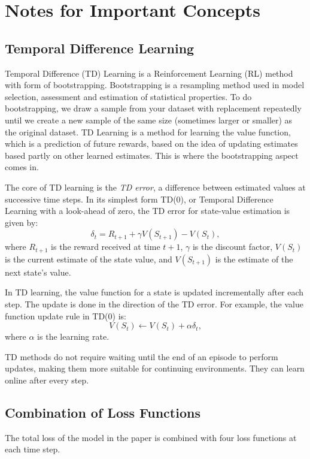 \documentclass[12pt,letterpaper,oneside]{article}
\begin{document}
	
	
\section{Notes for Important Concepts}

\subsection{Temporal Difference Learning}
	Temporal Difference (TD) Learning is a Reinforcement Learning (RL) method with form of bootstrapping. Bootstrapping is a resampling method used in model selection, assessment and estimation of statistical properties. To do bootstrapping, we draw a sample from your dataset with replacement repeatedly until we create a new sample of the same size (sometimes larger or smaller) as the original dataset. TD Learning is a method for learning the value function, which is a prediction of future rewards, based on the idea of updating estimates based partly on other learned estimates. This is where the bootstrapping aspect comes in.
	
	The core of TD learning is the \textit{TD error}, a difference between estimated values at successive time steps. In its simplest form TD(0), or Temporal Difference Learning with a look-ahead of zero, the TD error for state-value estimation is given by:
	\begin{equation}\label{eq:TD_error}
		\delta_t = R_{t+1} + \gamma V(S_{t+1}) - V(S_t),
	\end{equation}
	where \( R_{t+1} \) is the reward received at time \( t+1 \), \( \gamma \) is the discount factor, \( V(S_t) \) is the current estimate of the state value, and \( V(S_{t+1}) \) is the estimate of the next state's value.
	
	In TD learning, the value function for a state is updated incrementally after each step. The update is done in the direction of the TD error. For example, the value function update rule in TD(0) is:
	\begin{equation}
		V(S_t) \leftarrow V(S_t) + \alpha \delta_t,
	\end{equation}
	where \( \alpha \) is the learning rate.
	
	TD methods do not require waiting until the end of an episode to perform updates, making them more suitable for continuing environments. They can learn online after every step.
	
\subsection{Combination of Loss Functions}
	The total loss of the model in the paper is combined with four loss functions at each time step.
	
\end{document}

